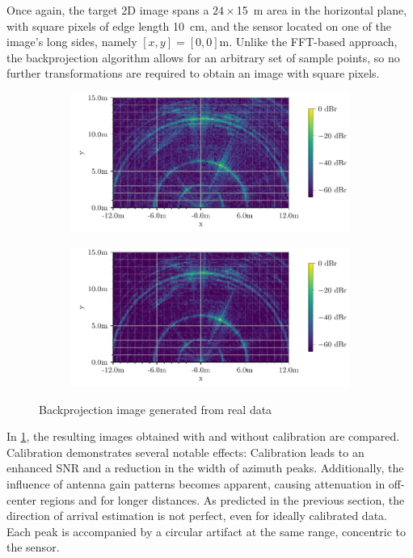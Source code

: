 Once again, the target 2D image spans a $24 \times$\SI{15}{\m} area in the horizontal plane,
with square pixels of edge length \SI{10}{\cm},
and the sensor located on one of the image's long sides, namely $[x,y] = [0,0]$m.
Unlike the FFT-based approach,
the backprojection algorithm allows for an arbitrary set of sample points,
so no further transformations are required to obtain an image with square pixels.\\
\begin{figure}[t]
    \centering
    \begin{subfigure}{0.8\textwidth}
        \includegraphics[width=\textwidth]{../figures/testimg_uncalibrated_bp.pdf}
    \end{subfigure}
    \begin{subfigure}{0.8\textwidth}
        \includegraphics[width=\textwidth]{../figures/testimg_calibrated_bp.pdf}
    \end{subfigure}
    \caption{Backprojection image generated from real data}
    \label{fig:bp_testimg}
\end{figure}
In \cref{fig:bp_testimg}, the resulting images obtained with and without calibration are compared.
Calibration demonstrates several notable effects:
Calibration leads to an enhanced SNR and a reduction in the width of azimuth peaks.
Additionally, the influence of antenna gain patterns becomes apparent,
causing attenuation in off-center regions and for longer distances.
As predicted in the previous section,
the direction of arrival estimation is not perfect, even for ideally calibrated data.
Each peak is accompanied by a circular artifact at the same range, concentric to the sensor.


